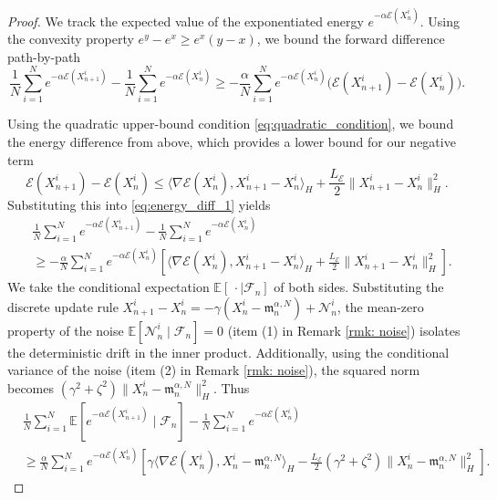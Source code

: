 \documentclass[12pt]{amsart}
\numberwithin{equation}{section}
\begin{document}
\begin{proof}
We track the expected value of the exponentiated energy $e^{-\alpha \mathscr{E}(X_n^i)}$. Using the convexity property $e^y - e^x \ge e^x(y-x)$, we bound the forward difference path-by-path
\begin{equation}\label{eq:energy_diff_1}
    \frac{1}{N} \sum_{i=1}^N e^{-\alpha \mathscr{E}(X_{n+1}^i)} - \frac{1}{N} \sum_{i=1}^N e^{-\alpha \mathscr{E}(X_n^i)} \ge -\frac{\alpha}{N} \sum_{i=1}^N e^{-\alpha \mathscr{E}(X_n^i)} \big( \mathscr{E}(X_{n+1}^i) - \mathscr{E}(X_n^i) \big).
\end{equation}

Using the quadratic upper-bound condition \eqref{eq:quadratic_condition}, we bound the energy difference from above, which provides a lower bound for our negative term
\begin{equation*}
    \mathscr{E}(X_{n+1}^i) - \mathscr{E}(X_n^i) \le \langle \nabla \mathscr{E}(X_n^i), X_{n+1}^i - X_n^i \rangle_H + \frac{L_\mathscr{E}}{2} \|X_{n+1}^i - X_n^i\|_H^2.
\end{equation*}
Substituting this into \eqref{eq:energy_diff_1} yields
\begin{equation}\label{eq:energy_diff_2}
\begin{aligned}
    &\frac{1}{N} \sum_{i=1}^N e^{-\alpha \mathscr{E}(X_{n+1}^i)} - \frac{1}{N} \sum_{i=1}^N e^{-\alpha \mathscr{E}(X_n^i)} \\
    &\ge -\frac{\alpha}{N} \sum_{i=1}^N e^{-\alpha \mathscr{E}(X_n^i)} \left[ \langle \nabla \mathscr{E}(X_n^i), X_{n+1}^i - X_n^i \rangle_H + \frac{L_\mathscr{E}}{2} \|X_{n+1}^i - X_n^i\|_H^2 \right].
\end{aligned}
\end{equation}
We take the conditional expectation $\mathbb{E}[\,\cdot \mid \mathcal{F}_n]$ of both sides. Substituting the discrete update rule $X_{n+1}^i - X_n^i = -\gamma(X_n^i - \mathfrak{m}_n^{\alpha, N}) + \mathcal{N}_n^i$, the mean-zero property of the noise $\mathbb{E}[\mathcal{N}_n^i \mid \mathcal{F}_n] = 0$ (item (1) in Remark \ref{rmk: noise}) isolates the deterministic drift in the inner product. Additionally, using the conditional variance of the noise (item (2) in Remark \ref{rmk: noise}), the squared norm becomes  $(\gamma^2 + \zeta^2) \|X_n^i - \mathfrak{m}_n^{\alpha, N}\|_H^2$. Thus
\begin{equation}\label{eq:conditional_energy_step}
\begin{aligned}
    &\frac{1}{N} \sum_{i=1}^N \mathbb{E}[e^{-\alpha \mathscr{E}(X_{n+1}^i)} \mid \mathcal{F}_n] - \frac{1}{N} \sum_{i=1}^N e^{-\alpha \mathscr{E}(X_n^i)} \\
    &\ge \frac{\alpha}{N} \sum_{i=1}^N e^{-\alpha \mathscr{E}(X_n^i)} \left[ \gamma \langle \nabla \mathscr{E}(X_n^i), X_n^i - \mathfrak{m}_n^{\alpha, N} \rangle_H - \frac{L_\mathscr{E}}{2} (\gamma^2 + \zeta^2) \|X_n^i - \mathfrak{m}_n^{\alpha, N}\|_H^2 \right].
\end{aligned}
\end{equation}


\end{proof}
\end{document}
